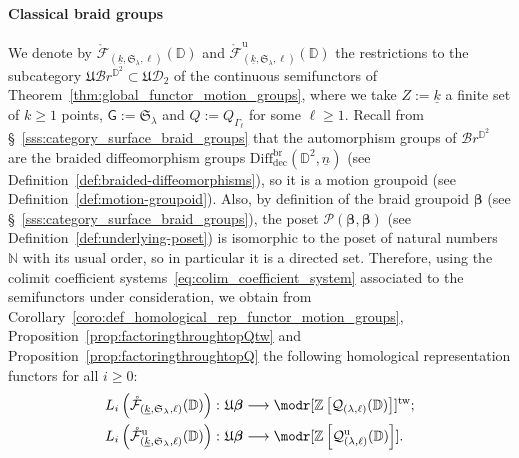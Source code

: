 \documentclass[AHL,Unicode,published]{cedram}
\newcommand{\Int}{\mathring}
\newcommand{\tw}{\mathrm{tw}}
\newcommand{\unt}{\mathrm{u}}
\newcommand{\rdec}{\mathrm{dec}}
\newcommand{\LCS}{\varGamma}
\newcommand{\Sym}{\mathfrak{S}}
\newcommand{\fU}{\ensuremath{\mathfrak{U}}}
\newcommand{\sG}{\mathsf{G}}
\newcommand{\cB}{\mathcal{B}}
\newcommand{\cD}{\mathcal{D}}
\newcommand{\cF}{\mathcal{F}}
\newcommand{\cP}{\mathcal{P}}
\newcommand{\cQ}{\mathcal{Q}}
\newcommand{\bD}{\mathbb{D}}
\newcommand{\bN}{\mathbb{N}}
\newcommand{\bZ}{\mathbb{Z}}
\newcommand{\too}{\ensuremath{\longrightarrow}}
\newcommand{\diffdecbr}{\ensuremath{\mathrm{Diff}_{\rdec}^{\mathrm{br}}}}
\newcommand{\Beta}{\boldsymbol{\beta}}
\renewcommand{\geq}{\geqslant}
\begin{document}
\paragraph*{Classical braid groups}
We denote by $\Int{\cF}_{(\underline{k},\Sym_{\lambda},\ell)}(\bD)$ and $\Int{\cF}^{\unt}_{(\underline{k},\Sym_{\lambda},\ell)}(\bD)$ the restrictions to the subcategory $\fU\cB r^{\bD^{2}}\subset \fU\cD_{2}$ of the continuous semifunctors of Theorem~\ref{thm:global_functor_motion_groups}, where we take $Z:=\underline{k}$ a finite set of $k\geq 1$ points, $\sG:=\Sym_{\lambda}$ and $Q:=Q_{\LCS_{\ell}}$ for some $\ell\geq 1$. Recall from \S~\ref{sss:category_surface_braid_groups} that the automorphism groups of $\cB r^{\bD^{2}}$ are the braided diffeomorphism groups $\diffdecbr(\bD^{2},\underline{n})$ (see Definition~\ref{def:braided-diffeomorphisms}), so it is a motion groupoid (see Definition~\ref{def:motion-groupoid}). Also, by definition of the braid groupoid $\Beta$ (see \S~\ref{sss:category_surface_braid_groups}), the poset $\cP(\Beta,\Beta)$ (see Definition~\ref{def:underlying-poset}) is isomorphic to the poset of natural numbers $\bN$ with its usual order, so in particular it is a directed set. Therefore, using the colimit coefficient systems~\eqref{eq:colim_coefficient_system} associated to the semifunctors under consideration, we obtain from Corollary~\ref{coro:def_homological_rep_functor_motion_groups}, Proposition~\ref{prop:factoringthroughtopQtw} and Proposition~\ref{prop:factoringthroughtopQ} the following homological representation functors for all $i\geq 0$:
\begin{equation}\label{eq:output_of_general_construction_classical_braids}
\begin{split}
L_{i}\left(\Int{\cF}_{(\underline{k},\Sym_{\lambda},\ell)}(\bD)\right) \colon \fU\Beta &\too \modr[\bZ\left[\cQ_{(\lambda,\ell)}(\bD)\right]]^{\tw}; \\
L_{i}\left(\Int{\cF}^{\unt}_{(\underline{k},\Sym_{\lambda},\ell)}(\bD)\right) \colon \fU\Beta &\too \modr[\bZ\left[\cQ^{\unt}_{(\lambda,\ell)}(\bD)\right]].
\end{split}
\end{equation}
\end{document}
